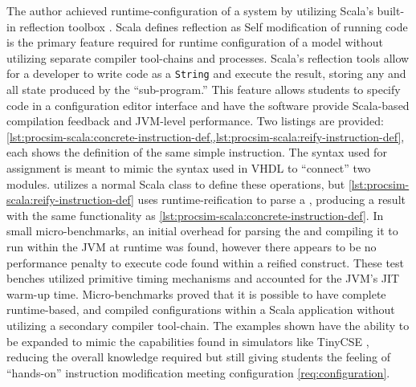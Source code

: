 The author achieved runtime-configuration of a system by utilizing Scala's built-in reflection toolbox \cite{Scala-Reflection}. Scala defines reflection as  Self modification of running code is the primary feature required for runtime configuration of a model without utilizing separate compiler tool-chains and processes. Scala's reflection tools allow for a developer to write code as a \texttt{String} and execute the result, storing any and all state produced by the ``sub-program.'' This feature allows students to specify code in a configuration editor interface and have the software provide Scala-based compilation feedback and JVM-level performance. Two listings are provided: \cref{lst:procsim-scala:concrete-instruction-def,,lst:procsim-scala:reify-instruction-def}, each shows the definition of the same simple instruction. The syntax used for assignment is meant to mimic the syntax used in VHDL to ``connect'' two modules.  utilizes a normal Scala class to define these operations, but \cref{lst:procsim-scala:reify-instruction-def} uses runtime-reification to parse a , producing a result with the same functionality as \cref{lst:procsim-scala:concrete-instruction-def}. In small micro-benchmarks, an initial overhead for parsing the  and compiling it to run within the JVM at runtime was found, however there appears to be no performance penalty to execute code found within a reified construct. These test benches utilized primitive timing mechanisms and accounted for the JVM's JIT warm-up time. Micro-benchmarks proved that it is possible to have complete runtime-based, and compiled configurations within a Scala application without utilizing a secondary compiler tool-chain. The examples shown have the ability to be expanded to mimic the capabilities found in simulators like TinyCSE \cite{Nakamura2013, McLoughlin2010}, reducing the overall knowledge required but still giving students the feeling of ``hands-on'' instruction modification meeting configuration \cref{req:configuration}.


